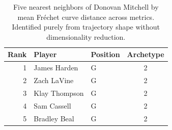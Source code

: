 \begin{table}[htbp]
  \centering\small
  \begin{tabular}{rllc}
    \toprule
    Rank & Player & Position & Archetype \\
    \midrule
    1 & James Harden & G & 2 \\
    2 & Zach LaVine & G & 2 \\
    3 & Klay Thompson & G & 2 \\
    4 & Sam Cassell & G & 2 \\
    5 & Bradley Beal & G & 2 \\
    \bottomrule
  \end{tabular}
  \caption{Five nearest neighbors of Donovan Mitchell by mean Fr\'{e}chet curve distance across metrics. Identified purely from trajectory shape without dimensionality reduction.}
  \label{tab:Donovan_Mitchell_frechet_curve_neighbors}
\end{table}

